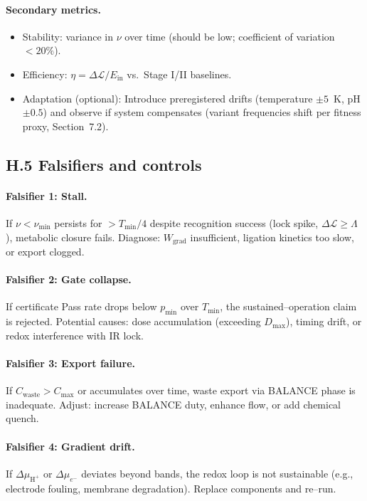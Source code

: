 \documentclass[11pt]{article}
\begin{document}
\paragraph{Secondary metrics.}
\begin{itemize}
\item Stability: variance in $\nu$ over time (should be low; coefficient of variation $<20\%$).
\item Efficiency: $\eta=\Delta\mathcal{L}/E_{\mathrm{in}}$ vs.\ Stage I/II baselines.
\item Adaptation (optional): Introduce preregistered drifts (temperature $\pm 5$~K, pH $\pm 0.5$) and observe if system compensates (variant frequencies shift per fitness proxy, Section~7.2).
\end{itemize}

\subsection*{H.5 Falsifiers and controls}

\paragraph{Falsifier 1: Stall.}
If $\nu<\nu_{\min}$ persists for $>T_{\min}/4$ despite recognition success (lock spike, $\Delta\mathcal{L}\ge\Lambda$), metabolic closure fails. Diagnose: $W_{\mathrm{grad}}$ insufficient, ligation kinetics too slow, or export clogged.

\paragraph{Falsifier 2: Gate collapse.}
If certificate \textsf{Pass} rate drops below $p_{\min}$ over $T_{\min}$, the sustained–operation claim is rejected. Potential causes: dose accumulation (exceeding $D_{\max}$), timing drift, or redox interference with IR lock.

\paragraph{Falsifier 3: Export failure.}
If $C_{\mathrm{waste}}>C_{\max}$ or accumulates over time, waste export via \textsf{BALANCE} phase is inadequate. Adjust: increase \textsf{BALANCE} duty, enhance flow, or add chemical quench.

\paragraph{Falsifier 4: Gradient drift.}
If $\Delta\mu_{\mathrm{H}^+}$ or $\Delta\mu_{e^-}$ deviates beyond bands, the redox loop is not sustainable (e.g., electrode fouling, membrane degradation). Replace components and re–run.
\end{document}
